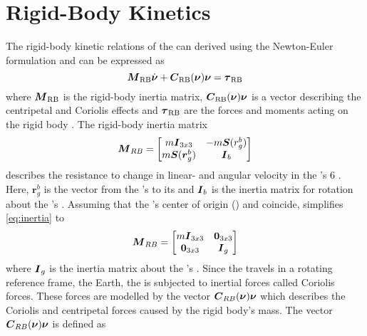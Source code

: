 \section{Rigid-Body Kinetics} 
The rigid-body kinetic relations of the \abbrROV can derived using the Newton-Euler formulation and can be expressed as
\begin{equation}\label{eq:rb}
\boldsymbol{M}_{\text{RB}}\dot{\boldsymbol{\nu}} + \boldsymbol{C}_{\text{RB}}(\boldsymbol{\nu})\boldsymbol{\nu} = \boldsymbol{\tau}_{\text{RB}}
\end{equation} where $\boldsymbol{M}_{\text{RB}}$ is the rigid-body inertia matrix, $\boldsymbol{C}_{\text{RB}}(\boldsymbol{\nu})\boldsymbol{\nu}$ is a vector describing the centripetal and Coriolis effects and $\boldsymbol{\tau}_{\text{RB}}$ are the forces and moments acting on the rigid body \citep[p. 45]{fossen2011}.
The rigid-body inertia matrix 
\begin{equation}
\label{eq:inertia}
    \boldsymbol{M}_{RB} = 
    \begin{bmatrix}
    m\boldsymbol{I}_{3x3}       & -m\boldsymbol{S}(r^b_g) \\
    m\boldsymbol{S}(\boldsymbol{r}^b_g) & \boldsymbol{I}_{b}
    \end{bmatrix}
\end{equation}
describes the resistance to change in linear- and angular velocity in the \abbrROV's 6 \abbrDOF. Here, $\boldsymbol{r}^b_g$ is the vector from the \abbrROV's \abbrCO to its \abbrCG and $\boldsymbol{I}_{b}$ is the inertia matrix for rotation about the \abbrROV's \abbrCO \citep[p. 50]{fossen2011}.
Assuming that the \abbrROV's center of origin (\abbrCO) and \abbrCG coincide, simplifies \eqref{eq:inertia} to
\begin{equation}
   \boldsymbol{M}_{RB} = 
    \begin{bmatrix}
        m\boldsymbol{I}_{3x3} & \boldsymbol{0}_{3x3} \\
        \boldsymbol{0}_{3x3} & \boldsymbol{I}_{g}
    \end{bmatrix}
\end{equation}
where $\boldsymbol{I}_{g}$ is the inertia matrix about the \abbrROV's \abbrCG.
Since the \abbrROV travels in a rotating reference frame, the Earth, the \abbrROV is subjected to inertial forces called Coriolis forces. These forces are modelled by the vector $\boldsymbol{C}_{RB}(\boldsymbol{\nu})\boldsymbol{\nu}$ which describes the Coriolis and centripetal forces caused by the rigid body's mass. The vector $\boldsymbol{C}_{RB}(\boldsymbol{\nu})\boldsymbol{\nu}$ is defined as
